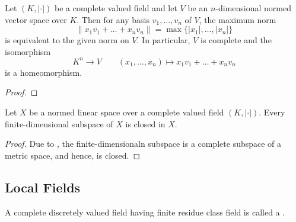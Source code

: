 \begin{theorem}
    Let $(K, |\cdot|)$ be a complete valued field and let $V$ be an $n$-dimensional normed vector space over $K$. Then for any basis $v_1,\dots,v_n$ of $V$, the maximum norm 
    \begin{equation*}
        \|x_1v_1 + \dots + x_nv_n\| = \max\{|x_1|,\dots,|x_n|\}
    \end{equation*}
    is equivalent to the given norm on $V$. In particular, $V$ is complete and the isomorphism 
    \begin{equation*}
        K^n\longrightarrow V\qquad (x_1,\dots,x_n)\longmapsto x_1v_1 + \dots + x_nv_n
    \end{equation*}
    is a homeomorphism.
\end{theorem}
\begin{proof}
    
\end{proof}

\begin{corollary}
    Let $X$ be a normed linear space over a complete valued field $(K, |\cdot|)$. Every finite-dimensional subspace of $X$ is closed in $X$.
\end{corollary}
\begin{proof}
    Due to , the finite-dimensionaln subspace is a complete subspace of a metric space, and hence, is closed.
\end{proof}

\subsection{Local Fields}

\begin{definition}
    A complete discretely valued field having finite residue class field is called a .
\end{definition}

